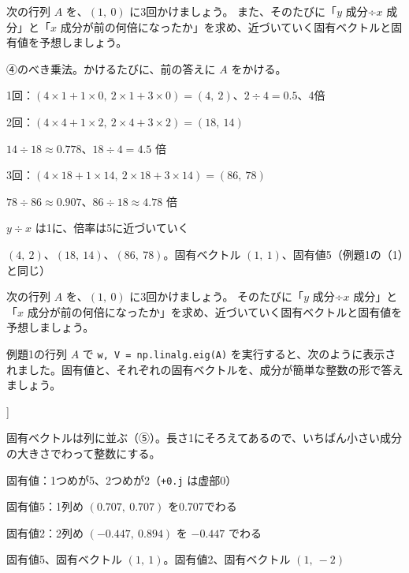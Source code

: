 \begin{reidai}
次の行列 $A$ を、$(1,\ 0)$ に3回かけましょう。
また、そのたびに「$y$ 成分÷$x$ 成分」と「$x$ 成分が前の何倍になったか」を求め、近づいていく固有ベクトルと固有値を予想しましょう。\par
\kangaekata ④のべき乗法。かけるたびに、前の答えに $A$ をかける。\par
\shiki\kviiis{}\zw{} 1回：$(4\times1+1\times0,\ 2\times1+3\times0)=(4,\ 2)$、$2\div4=0.5$、4倍\par
\kviiia 2回：$(4\times4+1\times2,\ 2\times4+3\times2)=(18,\ 14)$\par
\kviiib $14\div18\approx0.778$、$18\div4=4.5$ 倍\par
\kviiia 3回：$(4\times18+1\times14,\ 2\times18+3\times14)=(86,\ 78)$\par
\kviiib $78\div86\approx0.907$、$86\div18\approx4.78$ 倍\par
\kviiia $y\div x$ は1に、倍率は5に近づいていく\par
\kotae\kviiis{}\zw{} $(4,\ 2)$、$(18,\ 14)$、$(86,\ 78)$。固有ベクトル $(1,\ 1)$、固有値5（例題1の（1）と同じ）
\end{reidai}

\begin{jibun}
次の行列 $A$ を、$(1,\ 0)$ に3回かけましょう。
そのたびに「$y$ 成分÷$x$ 成分」と「$x$ 成分が前の何倍になったか」を求め、近づいていく固有ベクトルと固有値を予想しましょう。
\end{jibun}

\begin{reidai}
例題1の行列 $A$ で \texttt{w, V = np.linalg.eig(A)} を実行すると、次のように表示されました。固有値と、それぞれの固有ベクトルを、成分が簡単な整数の形で答えましょう。
\begin{bkcodeout}[実行結果]
[5.+0.j 2.+0.j]
[[ 0.70710678+0.j -0.4472136 +0.j]
 [ 0.70710678+0.j  0.89442719+0.j]]
\end{bkcodeout}
\kangaekata 固有ベクトルは列に並ぶ（⑤）。長さ1にそろえてあるので、いちばん小さい成分の大きさでわって整数にする。\par
\shiki\kviiis{}\zw{} 固有値：1つめが5、2つめが2（\texttt{+0.j} は虚部0）\par
\kviiia 固有値5：1列め $(0.707,\ 0.707)$ を0.707でわる\par
\kviiia 固有値2：2列め $(-0.447,\ 0.894)$ を $-0.447$ でわる\par
\kotae\kviiis{}\zw{} 固有値5、固有ベクトル $(1,\ 1)$。固有値2、固有ベクトル $(1,\ -2)$
\end{reidai}


